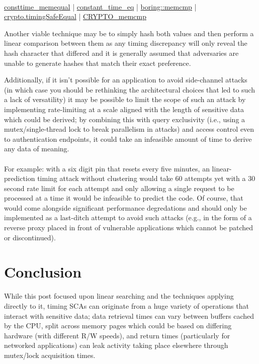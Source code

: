 		
		\\

		
			\href{https://man.freebsd.org/cgi/man.cgi?query=consttime_memequal&manpath=NetBSD+7.0}{consttime\_memequal} |
			\href{https://docs.rs/constant_time_eq/latest/constant_time_eq/}{constant\_time\_eq} |
			\href{https://docs.rs/boring/latest/boring/memcmp/index.html}{boring::memcmp} |
			\href{https://nodejs.org/api/crypto.html#crypto_crypto_timingsafeequal_a_b}{crypto.timingSafeEqual} |
			\href{https://www.openssl.org/docs/man1.1.1/man3/CRYPTO_memcmp.html}{CRYPTO\_memcmp}
		
		
			Another viable technique may be to simply hash both values and then perform a linear comparison between them as any timing discrepancy
			will only reveal the hash character that differed and it is generally assumed that adversaries are unable to generate hashes that
			match their exact preference.
		
		
			Additionally, if it isn't possible for an application to avoid side-channel attacks (in which case you should be rethinking the architectural choices that led
			to such a lack of versatility) it may be possible to limit the scope of such an attack by implementing rate-limiting at a scale aligned with the length of sensitive data which
			could be derived; by combining this with query exclusivity (i.e., using a mutex/single-thread lock to break parallelism in attacks) and access control even to
			authentication endpoints, it could take an infeasible amount of time to derive any data of meaning.\\
\\
For example: with a six digit pin that resets every five minutes,
			an linear-prediction timing attack without clustering would take 60 attempts yet with a 30 second rate limit for each attempt and only allowing a single request to be processed at a
			time it would be infeasible to predict the code. Of course, that would come alongside significant performance degredations and should only be implemented
			as a last-ditch attempt to avoid such attacks (e.g., in the form of a reverse proxy placed in front of vulnerable applications which cannot be patched or discontinued).
		

\section{Conclusion}
		
			While this post focused upon linear searching and the techniques applying directly to it, timing SCAs can originate from a huge variety of
			operations that interact with sensitive data; data retrieval times can vary between buffers cached by the CPU, split across memory pages which
			could be based on differing hardware (with different R/W speeds), and return times (particularly for networked applications) can leak activity
			taking place elsewhere through mutex/lock acquisition times.
		
